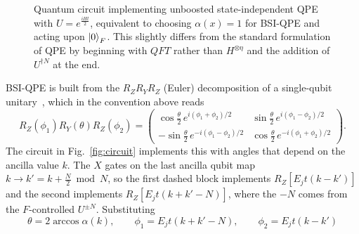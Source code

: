 \begin{figure}
    \centering
{} 

\caption{Quantum circuit implementing unboosted state-independent QPE with $U=e^{\frac{iHt}{2}}$, equivalent to choosing $\alpha(x)=1$ for BSI-QPE and acting upon $\ket{0}_F$. This slightly differs from the standard formulation of QPE \cite{Nielsen_Chuang_2010} by beginning with $QFT$ rather than $H^{\otimes \eta}$ and the addition of $U^{\dagger N}$ at the end. }
\label{fig:standard_qpe}
\end{figure}
BSI-QPE is built from the $R_ZR_YR_Z$ (Euler) decomposition of a single-qubit unitary~\cite{Nielsen_Chuang_2010}, which in the convention above reads
\begin{equation}
\label{eq:euler}
R_Z(\phi_1)R_Y(\theta)R_Z(\phi_2) = \begin{pmatrix}
\cos\frac{\theta}{2}\,e^{i(\phi_1+\phi_2)/2} & \sin\frac{\theta}{2}\,e^{i(\phi_1-\phi_2)/2}\\
-\sin\frac{\theta}{2}\,e^{-i(\phi_1-\phi_2)/2} & \cos\frac{\theta}{2}\,e^{-i(\phi_1+\phi_2)/2}
\end{pmatrix}.
\end{equation}
The circuit in Fig.~\ref{fig:circuit} implements this with angles that depend on the ancilla value $k$. The $X$ gates on the last ancilla qubit map $k\to k' = k+\frac{N}{2} \bmod N$, so the first dashed block implements $R_Z[E_jt(k-k')]$ and the second implements $R_Z[E_jt(k+k'-N)]$, where the $-N$ comes from the $F$-controlled $U^{\pm N}$. Substituting
\begin{equation}
\label{eq:angles}
\theta = 2\arccos\alpha(k),\qquad \phi_1 = E_jt(k+k'-N),\qquad \phi_2 = E_jt(k-k')
\end{equation}
